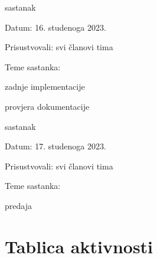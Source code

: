 \begin{packed_enum}
			\item  sastanak
			\item[] \begin{packed_item}
				\item Datum: 16. studenoga 2023.
				\item Prisustvovali: svi članovi tima
				\item Teme sastanka:
				\begin{packed_item}
					\item  zadnje implementacije
					\item  provjera dokumentacije
				\end{packed_item}
			\end{packed_item}
			
			\item  sastanak
			\item[] \begin{packed_item}
				\item Datum: 17. studenoga 2023.
				\item Prisustvovali: svi članovi tima
				\item Teme sastanka:
				\begin{packed_item}
					\item  predaja 
				\end{packed_item}
			\end{packed_item}
			
			
		\end{packed_enum}
		
		\eject
		\section*{Tablica aktivnosti}
		
			

